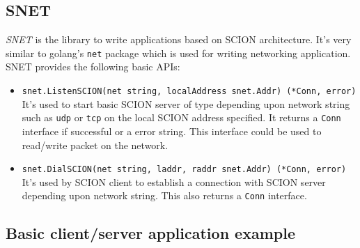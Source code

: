 \subsection{SNET}
\textit{SNET} is the library to write applications based on SCION architecture. It's very similar to golang's \texttt{net} package which is used for writing networking application. SNET provides the following basic APIs:
\begin{itemize}
    \item \texttt{snet.ListenSCION(net string, localAddress snet.Addr) (*Conn, error)} \\
    It's used to start basic SCION server of type depending upon network string such as \texttt{udp} or \texttt{tcp} on the local SCION address specified. It returns a \texttt{Conn} interface if successful or a error string. This interface could be used to read/write packet on the network.
    \item \texttt{snet.DialSCION(net string, laddr, raddr snet.Addr) (*Conn, error)}
    It's used by SCION client to establish a connection with SCION server depending upon network string. This also returns a \texttt{Conn} interface.
\end{itemize}

\subsection{Basic client/server application example}
\inputminted[frame=lines, framesep=2mm, baselinestretch=1.2, fontsize=\footnotesize, linenos]{go}{code_snippets/temp.go}
